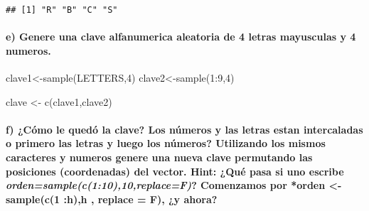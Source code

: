 \documentclass[
]{article}
\newenvironment{Shaded}{\begin{snugshade}}{\end{snugshade}}
\newcommand{\DecValTok}[1]{\textcolor[rgb]{0.00,0.00,0.81}{#1}}
\newcommand{\FunctionTok}[1]{\textcolor[rgb]{0.00,0.00,0.00}{#1}}
\newcommand{\NormalTok}[1]{#1}
\newcommand{\OtherTok}[1]{\textcolor[rgb]{0.56,0.35,0.01}{#1}}
\newcommand{\SpecialCharTok}[1]{\textcolor[rgb]{0.00,0.00,0.00}{#1}}
\begin{document}
\begin{verbatim}
## [1] "R" "B" "C" "S"
\end{verbatim}

\hypertarget{e-genere-una-clave-alfanumerica-aleatoria-de-4-letras-mayusculas-y-4-numeros.}{%
\paragraph{e) Genere una clave alfanumerica aleatoria de 4 letras
mayusculas y 4
numeros.}\label{e-genere-una-clave-alfanumerica-aleatoria-de-4-letras-mayusculas-y-4-numeros.}}

\begin{Shaded}
\begin{Highlighting}[]
\NormalTok{clave1}\OtherTok{\textless{}{-}}\FunctionTok{sample}\NormalTok{(LETTERS,}\DecValTok{4}\NormalTok{)}
\NormalTok{clave2}\OtherTok{\textless{}{-}}\FunctionTok{sample}\NormalTok{(}\DecValTok{1}\SpecialCharTok{:}\DecValTok{9}\NormalTok{,}\DecValTok{4}\NormalTok{)}

\NormalTok{clave }\OtherTok{\textless{}{-}} \FunctionTok{c}\NormalTok{(clave1,clave2)}
\end{Highlighting}
\end{Shaded}

\hypertarget{f-cuxf3mo-le-queduxf3-la-clave-los-nuxfameros-y-las-letras-estan-intercaladas-o-primero-las-letras-y-luego-los-nuxfameros-utilizando-los-mismos-caracteres-y-numeros-genere-una-nueva-clave-permutando-las-posiciones-coordenadas-del-vector.-hint-quuxe9-pasa-si-uno-escribe-ordensamplec11010replacef-comenzamos-por-orden---samplec1-hh-replace-f-y-ahora}{%
\paragraph{\texorpdfstring{f) ¿Cómo le quedó la clave? Los números y las
letras estan intercaladas o primero las letras y luego los números?
Utilizando los mismos caracteres y numeros genere una nueva clave
permutando las posiciones (coordenadas) del vector. Hint: ¿Qué pasa si
uno escribe \emph{orden=sample(c(1:10),10,replace=F)}? Comenzamos por
*orden \textless- sample(c(1 :h),h , replace = F), ¿y
ahora?}{f) ¿Cómo le quedó la clave? Los números y las letras estan intercaladas o primero las letras y luego los números? Utilizando los mismos caracteres y numeros genere una nueva clave permutando las posiciones (coordenadas) del vector. Hint: ¿Qué pasa si uno escribe orden=sample(c(1:10),10,replace=F)? Comenzamos por *orden \textless- sample(c(1 :h),h , replace = F), ¿y ahora?}}\label{f-cuxf3mo-le-queduxf3-la-clave-los-nuxfameros-y-las-letras-estan-intercaladas-o-primero-las-letras-y-luego-los-nuxfameros-utilizando-los-mismos-caracteres-y-numeros-genere-una-nueva-clave-permutando-las-posiciones-coordenadas-del-vector.-hint-quuxe9-pasa-si-uno-escribe-ordensamplec11010replacef-comenzamos-por-orden---samplec1-hh-replace-f-y-ahora}}
\end{document}
